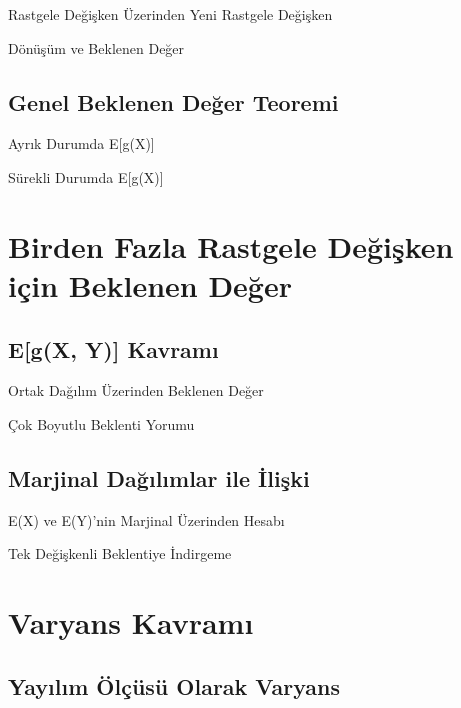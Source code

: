 \documentclass[light]{lutbeamer}
\begin{document}
\begin{frame}{Rastgele Değişken Üzerinden Yeni Rastgele Değişken}
\end{frame}

\begin{frame}{Dönüşüm ve Beklenen Değer}
\end{frame}

\subsection{Genel Beklenen Değer Teoremi}

\begin{frame}{Ayrık Durumda E[g(X)]}
\end{frame}

\begin{frame}{Sürekli Durumda E[g(X)]}
\end{frame}

\section{Birden Fazla Rastgele Değişken için Beklenen Değer}
\subsection{E[g(X, Y)] Kavramı}

\begin{frame}{Ortak Dağılım Üzerinden Beklenen Değer}
\end{frame}

\begin{frame}{Çok Boyutlu Beklenti Yorumu}
\end{frame}

\subsection{Marjinal Dağılımlar ile İlişki}

\begin{frame}{E(X) ve E(Y)'nin Marjinal Üzerinden Hesabı}
\end{frame}

\begin{frame}{Tek Değişkenli Beklentiye İndirgeme}
\end{frame}

\section{Varyans Kavramı}
\subsection{Yayılım Ölçüsü Olarak Varyans}
\end{document}
